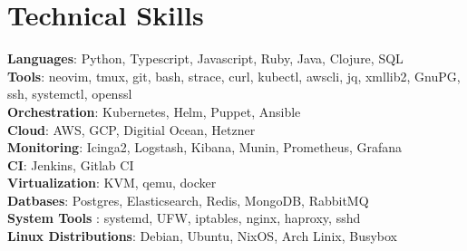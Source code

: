 \documentclass[letterpaper,11pt]{article}
\begin{document}
\section{Technical Skills}
 \begin{itemize}[leftmargin=0.15in, label={}]
    \small{\item{
     \textbf{Languages}{: Python, Typescript, Javascript, Ruby, Java, Clojure, SQL } \\
     \textbf{Tools}{: neovim, tmux, git, bash, strace, curl, kubectl, awscli, jq, xmllib2, GnuPG, ssh, systemctl, openssl } \\
     \textbf{Orchestration}{: Kubernetes, Helm, Puppet, Ansible } \\
     \textbf{Cloud}{: AWS, GCP, Digitial Ocean, Hetzner } \\
     \textbf{Monitoring}{: Icinga2, Logstash, Kibana, Munin, Prometheus, Grafana } \\
     \textbf{CI}{: Jenkins, Gitlab CI } \\
     \textbf{Virtualization}{: KVM, qemu, docker } \\
     \textbf{Datbases}{: Postgres, Elasticsearch, Redis, MongoDB, RabbitMQ } \\
     \textbf{System Tools}{ : systemd, UFW, iptables, nginx, haproxy, sshd } \\
     \textbf{Linux Distributions}{: Debian, Ubuntu, NixOS, Arch Linix, Busybox } \\
    }}
 \end{itemize}
\end{document}

